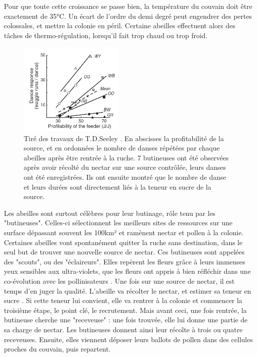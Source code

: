 			Pour que toute cette croissance se passe bien, la température du couvain doit être exactement de 35°C. Un écart de l'ordre du demi degré peut engendrer des pertes colossales, et mettre la colonie en péril. Certaine abeilles effectuent alors des tâches de thermo-régulation, lorsqu'il fait trop chaud ou trop froid. 

	\begin{figure}
	\includegraphics[width=0.45\textwidth]{Pictures/Graphs/SeeleyWaggles.JPG}
	\caption{Tiré des travaux de T.D.Seeley \cite{seeley_wisdom_1995}. En abscisses la profitabilité de la source, et en ordonnées le nombre de danses répétées par chaque abeilles après être rentrée à la ruche. 7 butineuses ont été observées après avoir récolté du nectar sur une source contrôlée, leurs danses ont été enregistrées. Ils ont ensuite montré que le nombre de danse et leurs durées sont directement liés à la teneur en sucre de la source.}
	\label{SeeleyWaggles}
	\end{figure}
			
			Les abeilles sont surtout célèbres pour leur butinage, rôle tenu par les "butineuses". Celles-ci sélectionnent les meilleurs sites de ressources sur une surface dépassant souvent les 100km² \cite{seeley_wisdom_1995} et ramènent nectar et pollen à la colonie. Certaines abeilles vont spontanément quitter la ruche sans destination, dans le seul but de trouver une nouvelle source de nectar. Ces butineuses sont appelées des "scouts", ou des "éclaireurs". Elles repèrent les fleurs grâce à leurs immenses yeux sensibles aux ultra-violets, que les fleurs ont appris à bien réfléchir dans une co-évolution avec les pollinisateurs \cite{thompson_concepts_1989}. Une fois sur une source de nectar, il est temps d'en juger la qualité. L'abeille va récolter le nectar, et estimer sa teneur en sucre \cite{seeley_wisdom_1995}. Si cette teneur lui convient, elle va rentrer à la colonie et commencer la troisième étape, le point clé, le recrutement. Mais avant ceci, une fois rentrée, la butineuse cherche une "receveuse" : une fois trouvée, elle lui donne une partie de sa charge de nectar. Les butineuses donnent ainsi leur récolte à trois ou quatre receveuses. Ensuite, elles viennent déposer leurs ballots de pollen dans des cellules proches du couvain, puis repartent. 
	
